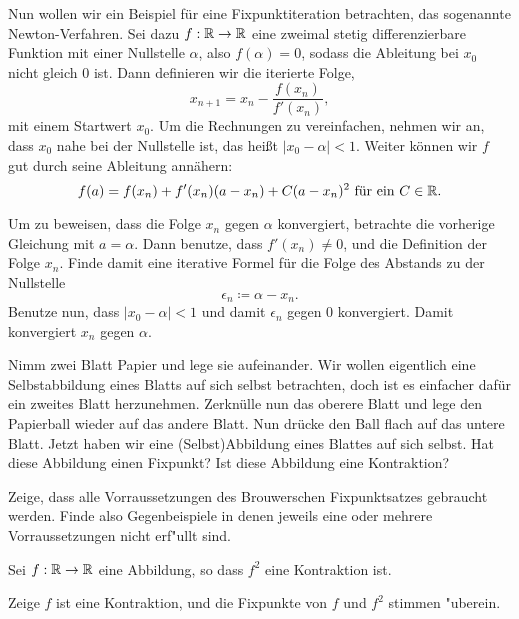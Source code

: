\documentclass[a4paper,10pt]{article}
\begin{document}
\begin{Aufg}

Nun wollen wir ein Beispiel für eine Fixpunktiteration betrachten, das sogenannte
Newton-Verfahren. Sei dazu $f:\mathbb{R} \to \mathbb{R}$
eine zweimal stetig differenzierbare Funktion mit einer Nullstelle $\alpha$, also $f(\alpha) =0$,
sodass die Ableitung bei $x_0$ nicht gleich 0 ist. Dann definieren wir die iterierte Folge,
\[
 x_{n+1} = x_n - \frac{f(x_n)}{f'(x_n)}, 
\]
mit einem Startwert $x_0$. Um die Rechnungen zu vereinfachen, nehmen wir an, dass $x_0$ nahe bei
der Nullstelle ist, das heißt $|x_0 - \alpha|<1$. 
Weiter können wir $f$ gut durch seine Ableitung annähern:
\[
 f(a) = f(x_n) + f'(x_n)(a-x_n) + C(a-x_n)^2 \text{ für ein } C \in \mathbb{R}.
\]

Um zu beweisen, dass die Folge $x_n$ gegen $\alpha$ konvergiert, betrachte die vorherige
Gleichung mit $a = \alpha$. Dann benutze, dass $f'(x_n) \neq0$, und die Definition der
Folge $x_n$. Finde damit eine iterative Formel für die Folge des Abstands zu der Nullstelle
\[
 \epsilon_n \coloneqq \alpha - x_{n}.
\]
Benutze nun, dass $|x_0 - \alpha|<1$ und damit $\epsilon_n$ gegen 0 konvergiert. Damit konvergiert
$x_n$ gegen $\alpha$.

\end{Aufg}


\begin{Aufg}
Nimm zwei Blatt Papier und lege sie aufeinander. Wir wollen eigentlich eine Selbstabbildung
eines Blatts auf sich selbst betrachten, doch ist es einfacher dafür ein zweites Blatt herzunehmen.
Zerknülle nun das oberere Blatt und lege den Papierball wieder auf das andere Blatt. Nun drücke den 
Ball flach auf das untere Blatt. Jetzt haben wir eine (Selbst)Abbildung eines Blattes auf sich selbst.
Hat diese Abbildung einen Fixpunkt? Ist diese Abbildung eine Kontraktion?
 
\end{Aufg}


\begin{Aufg}
 
 Zeige, dass alle Vorraussetzungen des Brouwerschen Fixpunktsatzes gebraucht werden. Finde also 
 Gegenbeispiele in denen jeweils eine oder mehrere Vorraussetzungen nicht erf"ullt sind.
 
\end{Aufg}

\begin{Aufg}
 Sei $f: \mathbb{R} \to \mathbb{R}$ eine Abbildung, so dass $f^2$ eine Kontraktion ist. 
 
 Zeige $f$ ist eine Kontraktion, und die Fixpunkte von $f$ und $f^2$ stimmen 
 "uberein.
 
\end{Aufg}
\end{document}
